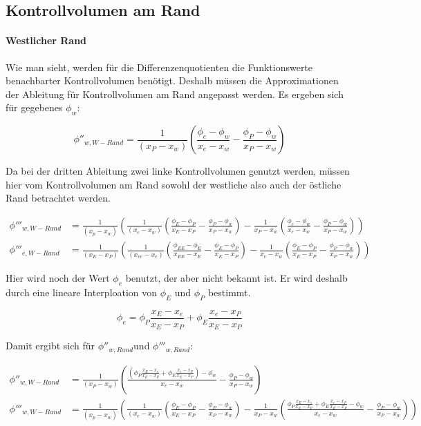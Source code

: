 \documentclass[10pt, ngerman,colorback,accentcolor=tud2d]{tudreport}
\begin{document}
\subsection{Kontrollvolumen am Rand}

\paragraph{Westlicher Rand}

Wie man sieht, werden für die Differenzenquotienten die Funktionswerte benachbarter
Kontrollvolumen benötigt. Deshalb müssen die Approximationen der Ableitung für
Kontrollvolumen am Rand angepasst werden. Es ergeben sich für gegebenes $\phi_w$:

\begin{equation*}
  \phi''_{w, W-Rand} = \frac{1}{(x_P-x_w)}\left({
\frac{\phi_{e}-\phi_w}{x_{e}-x_w}-\frac{\phi_P-\phi_w}{x_P-x_w}}\right)
\end{equation*}

Da bei der dritten Ableitung zwei linke Kontrollvolumen genutzt werden, müssen hier
vom Kontrollvolumen am Rand sowohl der westliche also auch der östliche Rand
betrachtet werden.

\begin{align*}
  \phi'''_{w, W-Rand} &= \frac{1}{(x_p-x_w)} \left({
  \frac{1}{(x_e-x_w)} \left({
    \frac{\phi_E-\phi_P}{x_E-x_P} - \frac{\phi_P-\phi_w}{x_P-x_w}
    }\right) -
  \frac{1}{x_P-x_w} \left({
    \frac{\phi_e-\phi_w}{x_e-x_w} - \frac{\phi_P-\phi_w}{x_P-x_w}
    }\right)
  }\right)
  \\
  \phi'''_{e, W-Rand} &= \frac{1}{(x_E-x_P)} \left({
  \frac{1}{(x_{ee}-x_e)} \left({
      \frac{\phi_{EE}-\phi_E}{x_{EE}-x_E} - \frac{\phi_E-\phi_P}{x_E-x_P}
    }\right) -
  \frac{1}{x_e-x_w} \left({
    \frac{\phi_E-\phi_P}{x_E-x_P} - \frac{\phi_P-\phi_w}{x_P-x_w}
    }\right)
  }\right)
\end{align*}

Hier wird noch der Wert $\phi_e$ benutzt, der aber nicht bekannt ist. Er wird deshalb
durch eine lineare Interploation von $\phi_E$ und $\phi_P$ bestimmt.

\begin{equation}
  \phi_e = \phi_P \frac{x_E-x_e}{x_E-x_P} + \phi_E \frac{x_e-x_P}{x_E-x_P}
\end{equation}

Damit ergibt sich für $\phi''_{w,Rand}$und $\phi'''_{w, Rand}$:

\begin{align}
  \phi''_{w, W-Rand} &= \frac{1}{(x_P-x_w)}\left({
\frac{
  \left({\phi_P \frac{x_E-x_e}{x_E-x_P} + \phi_E \frac{x_e-x_P}{x_E-x_P}
}\right)
-\phi_w}{x_{e}-x_w}-\frac{\phi_P-\phi_w}{x_P-x_w}}\right)\\
  \phi'''_{w, W-Rand} &= \frac{1}{(x_p-x_w)} \left({
  \frac{1}{(x_e-x_w)} \left({
    \frac{\phi_E-\phi_P}{x_E-x_P} - \frac{\phi_P-\phi_w}{x_P-x_w}
    }\right) -
  \frac{1}{x_P-x_w} \left({
    \frac{ \phi_P \frac{x_E-x_e}{x_E-x_P} + \phi_E \frac{x_e-x_P}{x_E-x_P}
-\phi_w}{x_e-x_w} - \frac{\phi_P-\phi_w}{x_P-x_w}
    }\right)
  }\right)
\end{align}
\end{document}
